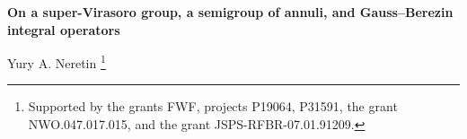\documentclass[]{amsart}
\def\frg{\mathfrak g}
\def\R {{\mathbb R }}
\def\SCont{\mathrm{SCont}}
\def\vir{\mathfrak{vir}}
\def\cont{\mathfrak{cont}}
\def\Cont{{\mathrm{Cont}}}
\def\vel{{\check{\circ\circ}}}
\begin{document}















\def\tto{\rightrightarrows}


\def\Frechet{Fr\'echet \vphantom{.}}
\def\Poincare{Poincar\'e}








\begin{center}
\bf\Large
On a super-Virasoro group, a semigroup of annuli, and Gauss--Berezin integral 
operators
\sc\large

\bigskip

Yury A. Neretin%
\footnote{Supported by the grants FWF, projects  P19064, P31591,
the grant  NWO.047.017.015, and the grant JSPS-RFBR-07.01.91209.}

\end{center}
\end{document}
